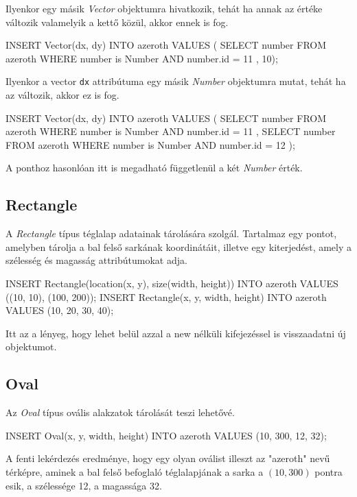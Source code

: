 Ilyenkor egy másik \textit{Vector} objektumra hivatkozik, tehát ha annak az értéke változik valamelyik a kettő közül, akkor ennek is fog.

\begin{sql}
INSERT Vector(dx, dy) INTO azeroth VALUES (
{ SELECT number FROM azeroth
  WHERE number is Number AND number.id = 11 }, 10);
\end{sql}

Ilyenkor a vector \texttt{dx} attribútuma egy másik \textit{Number} objektumra mutat, tehát ha az változik, akkor ez is fog.

\begin{sql}
INSERT Vector(dx, dy) INTO azeroth VALUES (
    { SELECT number FROM azeroth
      WHERE number is Number AND number.id = 11 },
    { SELECT number FROM azeroth
      WHERE number is Number AND number.id = 12 }
);
\end{sql}

A ponthoz hasonlóan itt is megadható függetlenül a két \textit{Number} érték.


\subsection{Rectangle}

A \textit{Rectangle} típus téglalap adatainak tárolására szolgál. Tartalmaz egy pontot, amelyben tárolja a bal felső sarkának koordinátáit, illetve egy kiterjedést, amely a szélesség és magasság attribútumokat adja.

\begin{sql}
INSERT Rectangle(location(x, y), size(width, height)) INTO azeroth 
VALUES ((10, 10), (100, 200)); 
INSERT Rectangle(x, y, width, height) INTO azeroth
VALUES (10, 20, 30, 40);
\end{sql}

Itt az a lényeg, hogy lehet belül azzal a new nélküli kifejezéssel is visszaadatni új objektumot.

\subsection{Oval}

Az \textit{Oval} típus ovális alakzatok tárolását teszi lehetővé. 

\begin{sql}
INSERT Oval(x, y, width, height) INTO azeroth 
VALUES (10, 300, 12, 32);
\end{sql}

A fenti lekérdezés eredménye, hogy egy olyan oválist illeszt az "azeroth" nevű térképre, aminek a bal felső befoglaló téglalapjának a sarka a $(10, 300)$ pontra esik, a szélessége 12, a magassága 32. 

